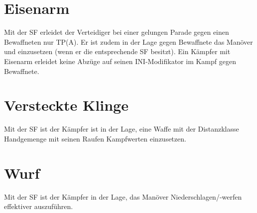 \section[Eisenarm (Raufen oder Ringen)]{Eisenarm
}
{\sffamily\color{black}
Mit der SF  erleidet der Verteidiger bei
einer gelungen Parade gegen einen Bewaffneten nur TP(A). Er ist zudem
in der Lage gegen Bewaffnete das Manöver 
und  einzusetzen (wenn er die
entsprechende SF besitzt). Ein Kämpfer mit Eisenarm erleidet keine
Abzüge auf seinen INI-Modifikator im Kampf gegen Bewaffnete.}

\section[Versteckte Klinge (Raufen)]{Versteckte Klinge
}
{\sffamily\color{black}
Mit der SF  ist der Kämpfer ist
in der Lage, eine Waffe mit der Distanzklasse Handgemenge mit seinen
Raufen Kampfwerten einzusetzen.}

\section{Wurf}
{\sffamily\color{black}
Mit der SF  ist der Kämpfer in der Lage, das
Manöver Niederschlagen/-werfen effektiver auszuführen.}
